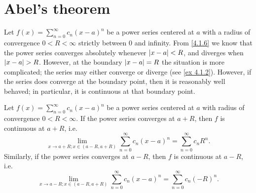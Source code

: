 \section{Abel's theorem}\label{sec 4.3}

\begin{note}
  Let \(f(x) = \sum_{n = 0}^\infty c_n (x - a)^n\) be a power series centered at \(a\) with a radius of convergence \(0 < R < \infty\) strictly between \(0\) and infinity.
  From \cref{4.1.6} we know that the power series converges absolutely whenever \(\left\lvert x - a\right\rvert < R\), and diverges when \(\left\lvert x - a\right\rvert > R\).
  However, at the boundary \(\left\lvert x - a\right\rvert = R\) the situation is more complicated;
  the series may either converge or diverge (see \cref{ex 4.1.2}).
  However, if the series does converge at the boundary point, then it is reasonably well behaved;
  in particular, it is continuous at that boundary point.
\end{note}

\begin{theorem}\label{4.3.1}
  Let \(f(x) = \sum_{n = 0}^\infty c_n (x - a)^n\) be a power series centered at \(a\) with radius of convergence \(0 < R < \infty\).
  If the power series converges at \(a + R\), then \(f\) is continuous at \(a + R\), i.e.
  \[
    \lim_{x \to a + R ; x \in (a - R, a + R)} \sum_{n = 0}^\infty c_n (x - a)^n = \sum_{n = 0}^\infty c_n R^n.
  \]
  Similarly, if the power series converges at \(a - R\), then \(f\) is continuous at \(a - R\), i.e.
  \[
    \lim_{x \to a - R ; x \in (a - R, a + R)} \sum_{n = 0}^\infty c_n (x - a)^n = \sum_{n = 0}^\infty c_n (-R)^n.
  \]
\end{theorem}

